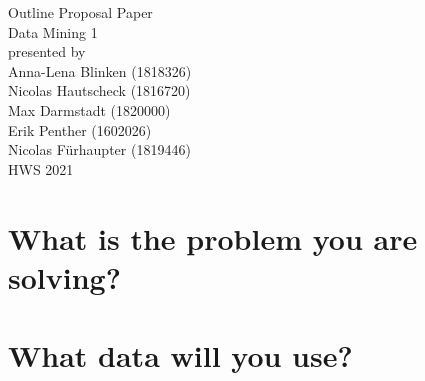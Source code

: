 \documentclass[11pt,titlepage,oneside,openany]{book}
\begin{document}
\begin{titlepage}
	\vspace*{2cm}
  \begin{center}
   {\Large Outline Proposal Paper\\}
   \vspace{2cm} 
   {Data Mining 1\\}
   \vspace{2cm}
   {presented by\\
    Anna-Lena Blinken (1818326)\\
	Nicolas Hautscheck (1816720)\\
	Max Darmstadt (1820000)\\
	Erik Penther (1602026)\\
	Nicolas Fürhaupter (1819446)\\
   }
   \vspace{1cm} 
   {HWS 2021}
  \end{center}
\end{titlepage} 

\tableofcontents
\newpage





\newpage



\chapter{What is the problem you are solving?}
\lipsum \cite{mochol08matcher}

\chapter{What data will you use?}
\end{document}
